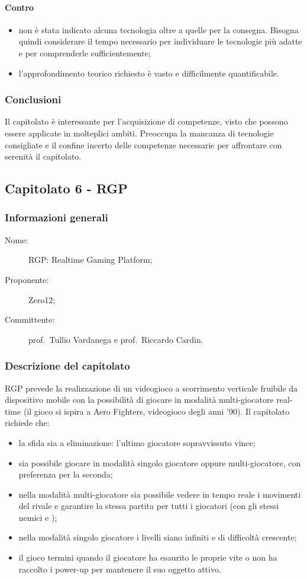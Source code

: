 \paragraph*{Contro}
\begin{itemize}
	\item non è stata indicato alcuna tecnologia oltre a quelle per la consegna. Bisogna quindi considerare il tempo necessario per individuare le tecnologie più adatte e per comprenderle sufficientemente;
	\item l'approfondimento teorico richiesto è vasto e difficilmente quantificabile.
\end{itemize}
\subsubsection{Conclusioni}
Il capitolato è interessante per l'acquisizione di competenze, visto che possono essere applicate in molteplici ambiti. Preoccupa la mancanza di tecnologie consigliate e il confine incerto delle competenze necessarie per affrontare con serenità il capitolato.

\subsection{Capitolato 6 - RGP}
\subsubsection{Informazioni generali}
\begin{description}
	\item[Nome:] RGP: Realtime Gaming Platform;
	\item[Proponente:] Zero12;
	\item[Committente:] prof.~Tullio Vardanega e prof.~Riccardo Cardin.
\end{description}
\subsubsection{Descrizione del capitolato}
RGP prevede la realizzazione di un videogioco a scorrimento verticale fruibile da dispositivo mobile con la possibilità di giocare in modalità multi-giocatore real-time (il gioco si ispira a Aero Fighters, videogioco degli anni '90). Il capitolato richiede che:
\begin{itemize}
	\item la sfida sia a eliminazione: l'ultimo giocatore sopravvissuto vince;
	\item sia possibile giocare in modalità singolo giocatore oppure multi-giocatore, con preferenza per la seconda; 
	\item nella modalità multi-giocatore sia possibile vedere in tempo reale i movimenti del rivale e garantire la stessa partita per tutti i giocatori (con gli stessi nemici e );
	\item nella modalità singolo giocatore i livelli siano infiniti e di difficoltà crescente;
	\item il gioco termini quando il giocatore ha esaurito le proprie vite o non ha raccolto i power-up per mantenere il suo oggetto attivo.
\end{itemize}
